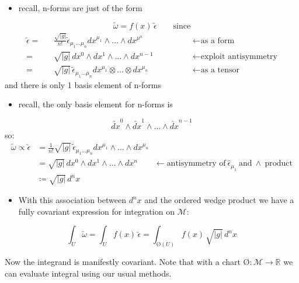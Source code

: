 \documentclass[10pt]{article}
\begin{document}
	\begin{itemize}[label=*]
	\item recall, n-forms are just of the form
	\end{itemize}
	$$\utilde{\omega} = f(x)\, \utilde{\epsilon} \qquad \text{since}$$
	\begin{align}
	\utilde{\epsilon} =&& \frac{\sqrt{|g|}}{n!} \tilde{\epsilon}_{\mu_{1} \ldots \mu_{n}} 
	dx^{\mu_{1}} \wedge \ldots \wedge dx^{\mu^{n}} \qquad \qquad & \leftarrow \text{as a form}\\[6pt]
	=&& \sqrt{|g|}\,dx^{0} \wedge dx^{1} \wedge \ldots \wedge dx^{n-1} \qquad \qquad & \leftarrow 
	\text{exploit antisymmetry}\\[6pt] 
	=&& \sqrt{|g|}\,\tilde{\epsilon}_{\mu_{1} \ldots \mu_{n}} dx^{\mu_{1}} \otimes \ldots \otimes dx^{\mu_{n}} 
	\qquad \qquad & \leftarrow \text{as a tensor}
	\end{align}
	and there is only 1 basis element of n-forms
	\begin{itemize}[label=*]
	\item recall, the only basis element for n-forms is
	\end{itemize}
	$$\utilde{dx}^0 \wedge \utilde{dx}^1 \wedge \ldots \wedge \utilde{dx}^{n-1}$$
	so:
	\begin{align}
	\utilde{\omega} \propto \utilde{\epsilon} &= \frac{1}{n!} \sqrt{|g|}\, 
	\tilde{\epsilon}_{\mu_{1} \ldots \mu_{n}} dx^{\mu_{1}} \wedge \ldots \wedge dx^{\mu_{n}}\\
	&= \sqrt{|g|}\,dx^{0} \wedge dx^{1} \wedge \ldots \wedge dx^{n} \qquad \leftarrow 
	\text{antisymmetry of} \ \hat{\epsilon}_{\mu_{1}} \ \text{and} \ \wedge \ \text{product}\\
	&\coloneqq \sqrt{|g|}\,d^{n}x
	\end{align}
	\begin{itemize}[label=*]
	\item With this association between $d^{n}x$ and the ordered wedge product we have a fully covariant
	expression for integration on $\mathcal{M}$:
	\end{itemize}

	$$\boxed{\int_{U} \utilde{\omega} = \int_{U} f(x)\, \utilde{\epsilon} = \int_{\text{\O} (U)} f(x)\, \sqrt{|g|}\,d^{n}x}$$

	Now the integrand is manifestly covariant. Note that with a chart $\text{\O}:\mathcal{M} \rightarrow \mathbb{R}$
	we can evaluate integral using our usual methods.\\
\end{document}
